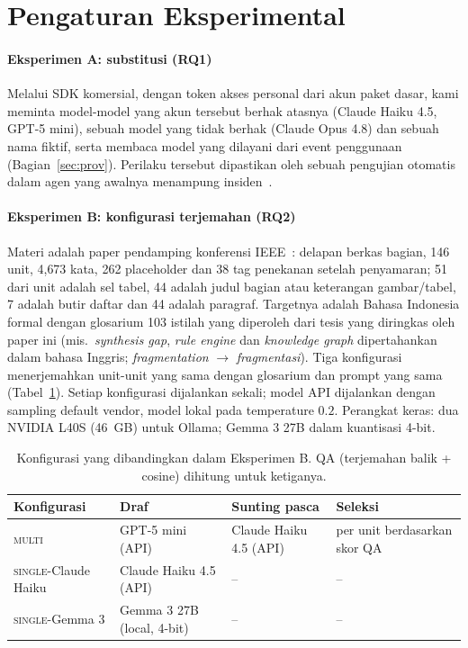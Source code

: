 \section{Pengaturan Eksperimental}
\label{sec:setup}

\paragraph{Eksperimen A: substitusi (RQ1)}
Melalui SDK komersial, dengan token akses personal dari akun paket dasar, kami meminta model-model yang akun tersebut berhak atasnya (Claude Haiku 4.5, GPT-5 mini), sebuah model yang tidak berhak (Claude Opus 4.8) dan sebuah nama fiktif, serta membaca model yang dilayani dari event penggunaan (Bagian~\ref{sec:prov}). Perilaku tersebut dipastikan oleh sebuah pengujian otomatis dalam agen yang awalnya menampung insiden~\cite{arya2026wizard}.

\paragraph{Eksperimen B: konfigurasi terjemahan (RQ2)}
Materi adalah paper pendamping konferensi IEEE~\cite{arya2026wizard}: delapan berkas bagian, 146 unit, 4{,}673 kata, 262 placeholder dan 38 tag penekanan setelah penyamaran; 51 dari unit adalah sel tabel, 44 adalah judul bagian atau keterangan gambar/tabel, 7 adalah butir daftar dan 44 adalah paragraf. Targetnya adalah Bahasa Indonesia formal dengan glosarium 103 istilah yang diperoleh dari tesis yang diringkas oleh paper ini (mis.\ \emph{synthesis gap}, \emph{rule engine} dan \emph{knowledge graph} dipertahankan dalam bahasa Inggris; \emph{fragmentation} $\rightarrow$ \emph{fragmentasi}). Tiga konfigurasi menerjemahkan unit-unit yang sama dengan glosarium dan prompt yang sama (Tabel~\ref{tab:configs}). Setiap konfigurasi dijalankan sekali; model API dijalankan dengan sampling default vendor, model lokal pada temperature $0.2$. Perangkat keras: dua NVIDIA L40S (46~GB) untuk Ollama; Gemma 3 27B dalam kuantisasi 4-bit.

\begin{table}[t]
  \caption{Konfigurasi yang dibandingkan dalam Eksperimen B. QA (terjemahan balik + cosine) dihitung untuk ketiganya.}
  \label{tab:configs}
  \centering
  \footnotesize
  \setlength{\tabcolsep}{3pt}
  \begin{tabular}{@{}lp{1.75cm}p{1.95cm}p{1.6cm}@{}}
    \toprule
    Konfigurasi & Draf & Sunting pasca & Seleksi \\
    \midrule
    \textsc{multi} & GPT-5 mini (API) & Claude Haiku 4.5 (API) & per unit berdasarkan skor QA \\
    \textsc{single}-Claude Haiku & Claude Haiku 4.5 (API) & -- & -- \\
    \textsc{single}-Gemma 3 & Gemma 3 27B (local, 4-bit) & -- & -- \\
    \bottomrule
  \end{tabular}
\end{table}

